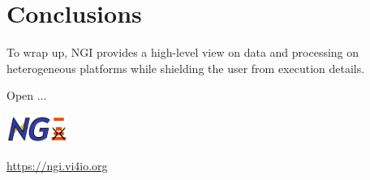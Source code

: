 \documentclass[a4paper, twocolumn]{article}
\begin{document}
\section{Conclusions}


To wrap up, NGI provides a high-level view on data and processing on heterogeneous platforms while shielding the user from execution details.

Open ...

\includegraphics[width=2cm]{ngi-logo}

\noindent\url{https://ngi.vi4io.org}
\end{document}

